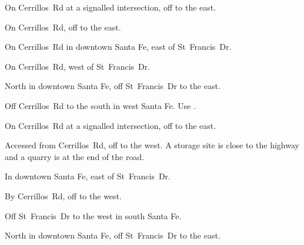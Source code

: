 
\begin{LocationList}

On Cerrillos~Rd at a signalled intersection, off  to the east.

On Cerrillos~Rd, off  to the east.

On Cerrillos~Rd in downtown Santa Fe, east of  St~Francis~Dr.

\Location{\GarageHQ \Garage}
On Cerrillos~Rd, west of  St~Francis~Dr.

\Location{\GasStation \Gas}
North in downtown Santa Fe, off  St~Francis~Dr to the east.

Off Cerrillos~Rd to the south in west Santa Fe.
Use .

On Cerrillos~Rd at a signalled intersection, off  to the east.

Accessed from Cerrillos~Rd, off  to the west.
A storage site is close to the highway and a quarry is at the end of the road.

\Location{\RecruitmentAgency \Recruitment}
In downtown Santa Fe, east of  St~Francis~Dr.

By Cerrillos~Rd, off  to the west.

\Location{\TruckService \Service}
Off  St~Francis~Dr to the west in south Santa Fe.

North in downtown Santa Fe, off  St~Francis~Dr to the east.

\end{LocationList}

